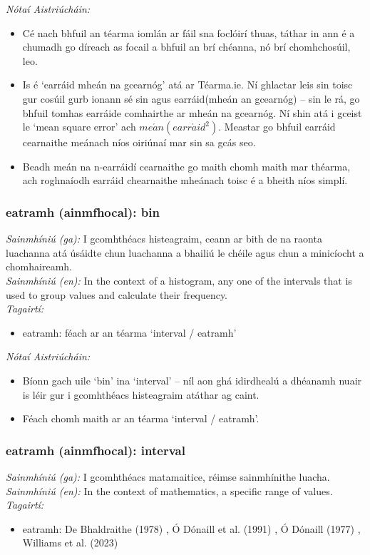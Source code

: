  \noindent \textit{Nótaí Aistriúcháin:}
\begin{itemize}
	\item Cé nach bhfuil an téarma iomlán ar fáil sna foclóirí thuas, táthar in ann é a chumadh go díreach as focail a bhfuil an brí chéanna, nó brí chomhchosúil, leo.
	\item Is é `earráid mheán na gcearnóg' atá ar Téarma.ie. Ní ghlactar leis sin toisc gur cosúil gurb ionann sé sin agus earráid(mheán an gcearnóg) -- sin le rá, go bhfuil tomhas earráide comhairthe ar mheán na gcearnóg. Ní shin atá i gceist le `mean square error' ach $me\acute{a}n(earr\acute{a}id^2)$. Meastar go bhfuil earráid cearnaithe meánach níos oiriúnaí mar sin sa gcás seo.
	\item Beadh meán na n-earráidí cearnaithe go maith chomh maith mar théarma, ach roghnaíodh earráid chearnaithe mheánach toisc é a bheith níos simplí.
\end{itemize}


\subsubsection*{eatramh (ainmfhocal): bin}
 \noindent \textit{Sainmhíniú (ga):} I gcomhthéacs histeagraim, ceann ar bith de na raonta luachanna atá úsáidte chun luachanna a bhailiú le chéile agus chun a minicíocht a chomhaireamh.
\\
 \noindent \textit{Sainmhíniú (en):} In the context of a histogram, any one of the intervals that is used to group values and calculate their frequency.
\\
 \noindent \textit{Tagairtí:}
\begin{itemize}
	\item eatramh: féach ar an téarma `interval / eatramh'
\end{itemize}

 \noindent \textit{Nótaí Aistriúcháin:}
\begin{itemize}
	\item Bíonn gach uile `bin' ina `interval' -- níl aon ghá idirdhealú a dhéanamh nuair is léir gur i gcomhthéacs histeagraim atáthar ag caint.
	\item Féach chomh maith ar an téarma `interval / eatramh'.
\end{itemize}


\subsubsection*{eatramh (ainmfhocal): interval}
 \noindent \textit{Sainmhíniú (ga):} I gcomhthéacs matamaitice, réimse sainmhínithe luacha.
\\
 \noindent \textit{Sainmhíniú (en):} In the context of mathematics, a specific range of values.
\\
 \noindent \textit{Tagairtí:}
\begin{itemize}
	\item eatramh: De Bhaldraithe (1978) \cite{de-bhaldraithe}, Ó Dónaill et al. (1991) \cite{focloir-beag}, Ó Dónaill (1977) \cite{odonaill}, Williams et al. (2023) \cite{storchiste}
\end{itemize}

